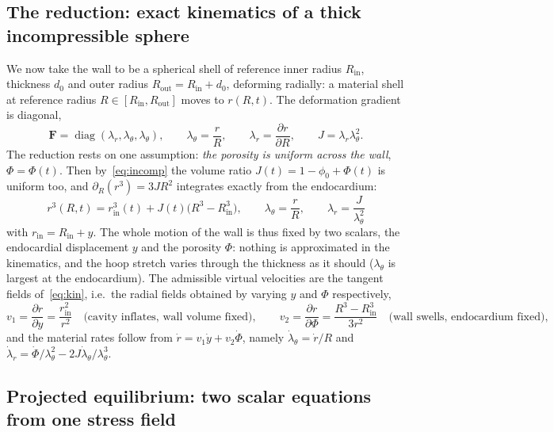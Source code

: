 \documentclass[11pt,a4paper]{article}
\newcommand{\bF}{\mathbf F}
\newcommand{\Rin}{R_{\mathrm{in}}}
\newcommand{\Rout}{R_{\mathrm{out}}}
\newcommand{\rin}{r_{\mathrm{in}}}
\newcommand{\lt}{\lambda_\theta}
\newcommand{\lr}{\lambda_r}
\begin{document}
\subsection{The reduction: exact kinematics of a thick incompressible sphere}
\label{sec:kin}

We now take the wall to be a spherical shell of reference inner radius $\Rin$, thickness $d_0$ and outer radius $\Rout=\Rin+d_0$, deforming radially: a material shell at reference radius $R\in[\Rin,\Rout]$ moves to $r(R,t)$. The deformation gradient is diagonal,
\begin{equation}
  \bF=\operatorname{diag}(\lr,\lt,\lt),\qquad
  \lt=\frac{r}{R},\qquad
  \lr=\frac{\partial r}{\partial R},\qquad
  J=\lr\lt^2 .
  \label{eq:F}
\end{equation}
The reduction rests on one assumption: \emph{the porosity is uniform across the wall}, $\Phi=\Phi(t)$. Then by~\eqref{eq:incomp} the volume ratio $J(t)=1-\phi_0+\Phi(t)$ is uniform too, and $\partial_R(r^3)=3JR^2$ integrates exactly from the endocardium:
\begin{equation}
  \boxed{\;
  r^3(R,t)=\rin^3(t)+J(t)\big(R^3-\Rin^3\big),\qquad
  \lt=\frac{r}{R},\qquad
  \lr=\frac{J}{\lt^2}\;}
  \label{eq:kin}
\end{equation}
with $\rin=\Rin+y$. The whole motion of the wall is thus fixed by two scalars, the endocardial displacement $y$ and the porosity $\Phi$: nothing is approximated in the kinematics, and the hoop stretch varies through the thickness as it should ($\lt$ is largest at the endocardium). The admissible virtual velocities are the tangent fields of~\eqref{eq:kin}, i.e.\ the radial fields obtained by varying $y$ and $\Phi$ respectively,
\begin{equation}
  v_1=\frac{\partial r}{\partial y}=\frac{\rin^2}{r^2}
  \quad\text{(cavity inflates, wall volume fixed)},\qquad
  v_2=\frac{\partial r}{\partial\Phi}=\frac{R^3-\Rin^3}{3r^2}
  \quad\text{(wall swells, endocardium fixed)},
  \label{eq:tangent}
\end{equation}
and the material rates follow from $\dot r=v_1\dot y+v_2\dot\Phi$, namely $\dot\lt=\dot r/R$ and $\dot\lr=\dot\Phi/\lt^2-2J\dot\lt/\lt^3$.

\subsection{Projected equilibrium: two scalar equations from one stress field}
\label{sec:proj}
\end{document}
